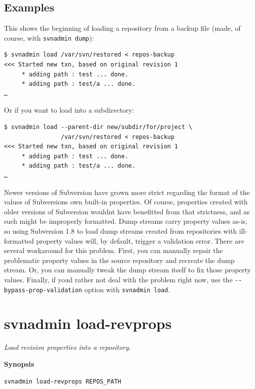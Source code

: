 \subsection{Examples}

This shows the beginning of loading a repository from a backup file
(made, of course, with \texttt{svnadmin\ dump}):

\begin{verbatim}
$ svnadmin load /var/svn/restored < repos-backup
<<< Started new txn, based on original revision 1
     * adding path : test ... done.
     * adding path : test/a ... done.
…
\end{verbatim}

Or if you want to load into a subdirectory:

\begin{verbatim}
$ svnadmin load --parent-dir new/subdir/for/project \
                /var/svn/restored < repos-backup
<<< Started new txn, based on original revision 1
     * adding path : test ... done.
     * adding path : test/a ... done.
…
\end{verbatim}

Newer versions of Subversion have grown more strict regarding the format
of the values of Subversion\textquotesingle s own built-in properties.
Of course, properties created with older versions of Subversion
wouldn\textquotesingle t have benefitted from that strictness, and as
such might be improperly formatted. Dump streams carry property values
as-is, so using Subversion 1.8 to load dump streams created from
repositories with ill-formatted property values will, by default,
trigger a validation error. There are several workaround for this
problem. First, you can manually repair the problematic property values
in the source repository and recreate the dump stream. Or, you can
manually tweak the dump stream itself to fix those property values.
Finally, if you\textquotesingle d rather not deal with the problem right
now, use the \texttt{-\/-bypass-prop-validation} option with
\texttt{svnadmin\ load}.

\section{svnadmin
load-revprops}\label{svn.ref.svnadmin.c.load-revprops}

\emph{Load revision properties into a repository.}

\textbf{Synopsis}

\texttt{svnadmin\ load-revprops\ REPOS\_PATH}

